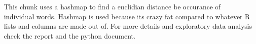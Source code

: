 \documentclass[]{article}
\newenvironment{Shaded}{\begin{snugshade}}{\end{snugshade}}
\newcommand{\DataTypeTok}[1]{\textcolor[rgb]{0.13,0.29,0.53}{#1}}
\newcommand{\DecValTok}[1]{\textcolor[rgb]{0.00,0.00,0.81}{#1}}
\newcommand{\FloatTok}[1]{\textcolor[rgb]{0.00,0.00,0.81}{#1}}
\newcommand{\KeywordTok}[1]{\textcolor[rgb]{0.13,0.29,0.53}{\textbf{#1}}}
\newcommand{\NormalTok}[1]{#1}
\newcommand{\OperatorTok}[1]{\textcolor[rgb]{0.81,0.36,0.00}{\textbf{#1}}}
\newcommand{\StringTok}[1]{\textcolor[rgb]{0.31,0.60,0.02}{#1}}
\begin{document}
\begin{Shaded}
\end{Shaded}

This chunk uses a hashmap to find a euclidian distance be occurance of
individual words. Hashmap is used because its crazy fat compared to
whatever R lists and columns are made out of. For more details and
exploratory data analysis check the report and the python document.
\end{document}
